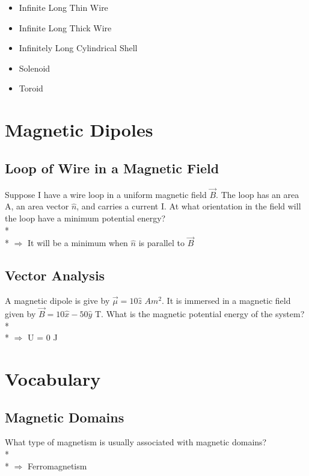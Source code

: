 \documentclass[11pt]{article}
\begin{document}
\begin{itemize}
\item Infinite Long Thin Wire
\item Infinite Long Thick Wire
\item Infinitely Long Cylindrical Shell
\item Solenoid
\item Toroid
\end{itemize}


\pagebreak
\section{Magnetic Dipoles}
\vspace{10pt}

\subsection{Loop of Wire in a Magnetic Field}
Suppose I have a wire loop in a uniform magnetic field $\vec{B}$.  The loop has an area A, an area vector $\hat{n}$, and carries a current I.  At what orientation in the field will the loop have a minimum potential energy? \\* \\*
$\Rightarrow$ It will be a minimum when $\hat{n}$ is parallel to $\vec{B}$

\subsection{Vector Analysis}
A magnetic dipole is give by $\vec{\mu} = 10 \hat{z}$ $Am^2$.  It is immersed in a magnetic field given by $\vec{B} = 10 \hat{x} - 50\hat{y}$ T.  What is the magnetic potential energy of the system? \\* \\*
$\Rightarrow$ U = 0 J


\pagebreak
\section{Vocabulary}
\vspace{10pt}

\subsection{Magnetic Domains}
What type of magnetism is usually associated with magnetic domains? \\* \\*
$\Rightarrow$ Ferromagnetism
\end{document}

